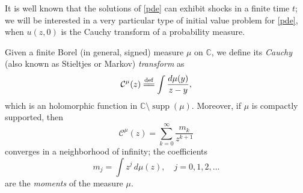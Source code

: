 \documentclass[reqno,11pt]{amsart}
\theoremstyle{plain}
\theoremstyle{definition}
\theoremstyle{remark}
\numberwithin{equation}{section}
\numberwithin{equation}{section}
\DeclareMathOperator{\supp}{supp}
\newcommand{\C}{\mathbb{C}}
\newcommand{\isdef}{\overset{\mathrm{def}}{=\joinrel=}}
\begin{document}
It is well known that the solutions of \eqref{pde} can exhibit shocks in a finite time $t$; we will be interested in a very particular type of initial value problem for \eqref{pde}, when $u(z,0)$ is the Cauchy transform of a probability measure.

Given a finite Borel (in general, signed) measure $\mu$ on $\C$, we define its \textit{Cauchy} (also known as Stieltjes or Markov) \textit{transform}  as
\begin{equation} \label{def:Cauchy}
	\mathcal C^\mu(z)\isdef  \int \frac{d\mu(y)}{z-y},
\end{equation}
which is an holomorphic function in $\C \setminus \supp(\mu)$.  Moreover, if $\mu$ is compactly supported, then 
\begin{equation}
    \label{seriesCauchyTransform}
\mathcal C^\mu(z) = \sum_{k=0}^\infty \frac{m_k}{z^{k+1}} 
\end{equation}
converges in a neighborhood of infinity; the coefficients  
\begin{equation}
    \label{moments}
    m_j =\int z^j \, d\mu(z), \quad j=0, 1, 2,\dots
\end{equation}
are the \textit{moments} of the measure $\mu$. 
\end{document}
